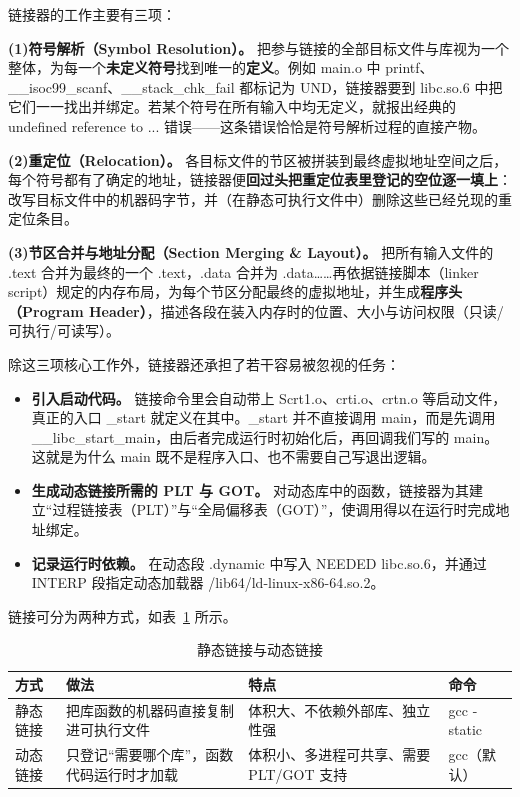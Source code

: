 \documentclass[UTF8,a4paper,10pt]{ctexart}
\newcommand{\headcol}{\bfseries}
\begin{document}
链接器的工作主要有三项：

\noindent\textbf{(1)符号解析（Symbol Resolution）。} 把参与链接的全部目标文件与库视为一个整体，为每一个\textbf{未定义符号}找到唯一的\textbf{定义}。例如 main.o 中 printf、\_\_isoc99\_scanf、\_\_stack\_chk\_fail 都标记为 UND，链接器要到 libc.so.6 中把它们一一找出并绑定。若某个符号在所有输入中均无定义，就报出经典的 undefined reference to ... 错误——这条错误恰恰是符号解析过程的直接产物。

\noindent\textbf{(2)重定位（Relocation）。} 各目标文件的节区被拼装到最终虚拟地址空间之后，每个符号都有了确定的地址，链接器便\textbf{回过头把重定位表里登记的空位逐一填上}：改写目标文件中的机器码字节，并（在静态可执行文件中）删除这些已经兑现的重定位条目。

\noindent\textbf{(3)节区合并与地址分配（Section Merging \& Layout）。} 把所有输入文件的 .text 合并为最终的一个 .text，.data 合并为 .data……再依据链接脚本（linker script）规定的内存布局，为每个节区分配最终的虚拟地址，并生成\textbf{程序头（Program Header）}，描述各段在装入内存时的位置、大小与访问权限（只读/可执行/可读写）。

除这三项核心工作外，链接器还承担了若干容易被忽视的任务：

\begin{itemize}
  \item \textbf{引入启动代码。} 链接命令里会自动带上 Scrt1.o、crti.o、crtn.o 等启动文件，真正的入口 \_start 就定义在其中。\_start 并不直接调用 main，而是先调用 \_\_libc\_start\_main，由后者完成运行时初始化后，再回调我们写的 main。这就是为什么 main 既不是程序入口、也不需要自己写退出逻辑。
  \item \textbf{生成动态链接所需的 PLT 与 GOT。} 对动态库中的函数，链接器为其建立“过程链接表（PLT）”与“全局偏移表（GOT）”，使调用得以在运行时完成地址绑定。
  \item \textbf{记录运行时依赖。} 在动态段 .dynamic 中写入 NEEDED libc.so.6，并通过 INTERP 段指定动态加载器 /lib64/ld-linux-x86-64.so.2。
\end{itemize}

链接可分为两种方式，如表~\ref{tab:linktype} 所示。

\begin{table}[H]
  \centering
  \small
  \setlength{\tabcolsep}{4pt}
  \begin{tabular}{>{\centering\arraybackslash}p{1.8cm}>{\centering\arraybackslash}p{5.2cm}>{\centering\arraybackslash}p{4.4cm}>{\centering\arraybackslash}p{2cm}}
    \toprule
\headcol 方式 & \headcol 做法 & \headcol 特点 & \headcol 命令 \\
    \midrule
静态链接 & 把库函数的机器码直接复制进可执行文件 & 体积大、不依赖外部库、独立性强 & gcc -static \\
    动态链接 & 只登记“需要哪个库”，函数代码运行时才加载 & 体积小、多进程可共享、需要 PLT/GOT 支持 & gcc（默认） \\
    \bottomrule
\end{tabular}
  \caption{静态链接与动态链接}
  \label{tab:linktype}
\end{table}
\end{document}
